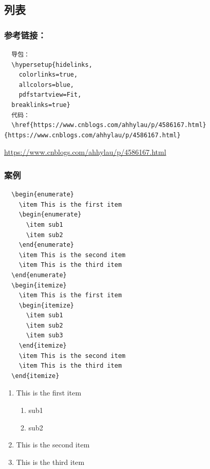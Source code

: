 \documentclass[onecolumn,oneside]{SUSTechHomework}
\begin{document}
\subsection{列表}
\subsubsection{参考链接：}
\begin{lstlisting}
  导包：
  \hypersetup{hidelinks,
	colorlinks=true,
	allcolors=blue,
	pdfstartview=Fit,
  breaklinks=true}
  代码：
  \href{https://www.cnblogs.com/ahhylau/p/4586167.html}{https://www.cnblogs.com/ahhylau/p/4586167.html}
\end{lstlisting}
\href{https://www.cnblogs.com/ahhylau/p/4586167.html}{https://www.cnblogs.com/ahhylau/p/4586167.html}
\subsubsection{案例}
\begin{lstlisting}
  \begin{enumerate}
    \item This is the first item
    \begin{enumerate}
      \item sub1
      \item sub2
    \end{enumerate}
    \item This is the second item
    \item This is the third item
  \end{enumerate}
  \begin{itemize}
    \item This is the first item
    \begin{itemize}
      \item sub1
      \item sub2
      \item sub3
    \end{itemize}
    \item This is the second item
    \item This is the third item
  \end{itemize}
\end{lstlisting}
\begin{enumerate}
  \item This is the first item
  \begin{enumerate}
    \item sub1
    \item sub2
  \end{enumerate}
  \item This is the second item
  \item This is the third item
\end{enumerate}
\end{document}

